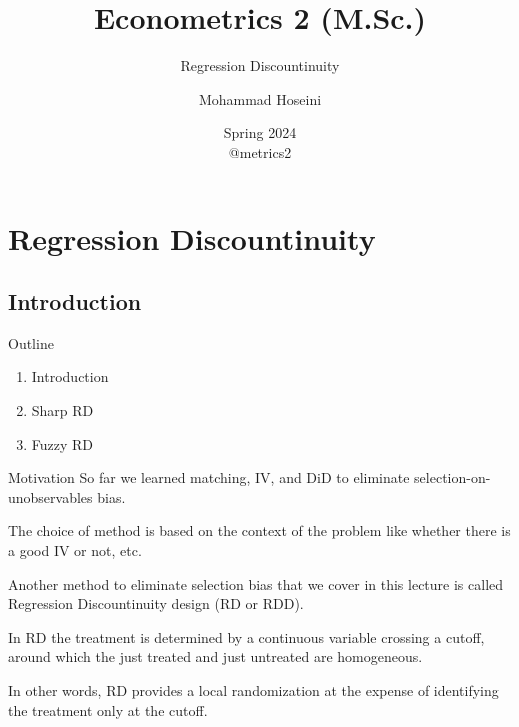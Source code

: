 \documentclass[handout]{beamer}
\begin{document}
	\title[Econometrics 2]{Econometrics 2 (M.Sc.)}
	\subtitle{Regression Discountinuity}
	\author[Mohammad Hoseini]{Mohammad Hoseini}
	
	
\date[Spring 2024]{Spring 2024 \\
	\vspace{10pt} @metrics2
}

	
\begin{frame}[plain]
	\titlepage
\end{frame}

\section{Regression Discountinuity}
\subsection{Introduction}

\begin{frame}{Outline}

\begin{enumerate}
	\item Introduction
	\item Sharp RD
	\item Fuzzy RD
\end{enumerate}\bigskip


\end{frame}

\begin{frame}{Motivation}
So far we learned matching, IV,  and DiD to eliminate selection-on-unobservables bias.\bigskip

The choice of method is based on the context of the problem like whether there is a good IV or not, etc.\bigskip

Another method to eliminate selection bias that we cover in this lecture is called Regression Discountinuity design (RD or RDD).\bigskip

In RD the treatment is determined by a continuous variable crossing a cutoff, around which the just treated and just untreated are homogeneous.\bigskip

In other words, RD provides a local randomization at the expense of identifying the treatment only at the cutoff.
\end{frame}
\end{document}
